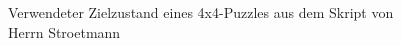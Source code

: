 \begin{minipage}{\linewidth}
\begin{minipage}[t]{0.45\linewidth}
\begin{figure}[H]
			\captionsetup{format=plain, indention=0pt}
			\caption{\label{fig:Perm_puzzle_end_stroet}Verwendeter Zielzustand eines 4x4-Puzzles aus dem Skript von Herrn Stroetmann \autocite{github-stroetmann:online}}
		\end{figure}
	\end{minipage}
\end{minipage}\WNL%
